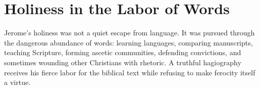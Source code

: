 \section{Holiness in the Labor of Words}

Jerome's holiness was not a quiet escape from language. It was pursued through
the dangerous abundance of words: learning languages, comparing manuscripts,
teaching Scripture, forming ascetic communities, defending convictions, and
sometimes wounding other Christians with rhetoric. A truthful hagiography
receives his fierce labor for the biblical text while refusing to make
ferocity itself a virtue.
